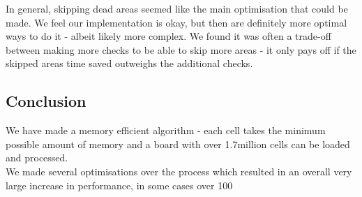 \documentclass[]{article}
\begin{document}
In general, skipping dead areas seemed like the main optimisation that could be made. We feel our implementation is okay, but then are definitely more optimal ways to do it - albeit likely more complex. We found it was often a trade-off between making more checks to be able to skip more areas - it only pays off if the skipped areas time saved outweighs the additional checks.

\subsection{Conclusion}
We have made a memory efficient algorithm - each cell takes the minimum possible amount of memory and a board with over 1.7million cells can be loaded and processed.\\
We made several optimisations over the process which resulted in an overall very large increase in performance, in some cases over 100%
\end{document}
